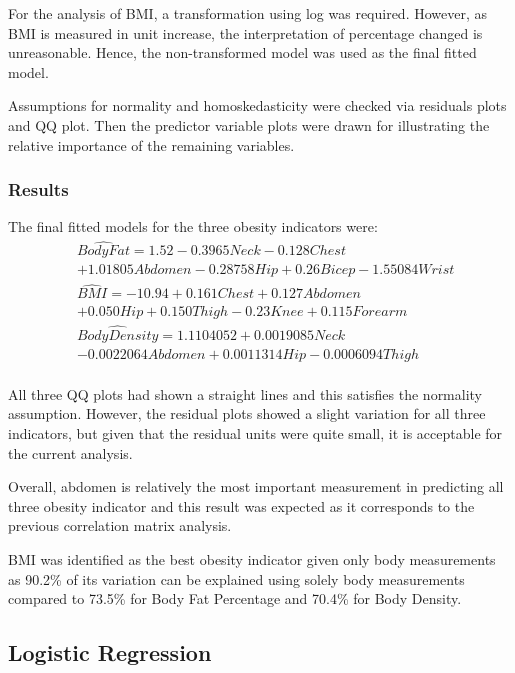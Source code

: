 \documentclass[a4paper,9pt,twocolumn,twoside,]{pinp}
\begin{document}
For the analysis of BMI, a transformation using log was required.
However, as BMI is measured in unit increase, the interpretation of
percentage changed is unreasonable. Hence, the non-transformed model was
used as the final fitted model.

Assumptions for normality and homoskedasticity were checked via
residuals plots and QQ plot. Then the predictor variable plots were
drawn for illustrating the relative importance of the remaining
variables.

\hypertarget{results}{%
\subsubsection{Results}\label{results}}

The final fitted models for the three obesity indicators were: \[ 
\begin{aligned}
&\hat{Body Fat} = 1.52 -0.3965Neck - 0.128Chest\\
&+ 1.01805Abdomen -0.28758Hip + 0.26Bicep -1.55084Wrist\\
&\hat{BMI} = -10.94 +0.161Chest + 0.127Abdomen\\
&+ 0.050Hip + 0.150Thigh - 0.23Knee + 0.115Forearm\\
&\hat{Body Density} = 1.1104052 + 0.0019085 Neck\\
&- 0.0022064Abdomen + 0.0011314 Hip - 0.0006094 Thigh\\
\end{aligned}
\]

All three QQ plots had shown a straight lines and this satisfies the
normality assumption. However, the residual plots showed a slight
variation for all three indicators, but given that the residual units
were quite small, it is acceptable for the current analysis.

Overall, abdomen is relatively the most important measurement in
predicting all three obesity indicator and this result was expected as
it corresponds to the previous correlation matrix analysis.

BMI was identified as the best obesity indicator given only body
measurements as 90.2\% of its variation can be explained using solely
body measurements compared to 73.5\% for Body Fat Percentage and 70.4\%
for Body Density.

\hypertarget{logistic-regression}{%
\subsection{Logistic Regression}\label{logistic-regression}}
\end{document}
